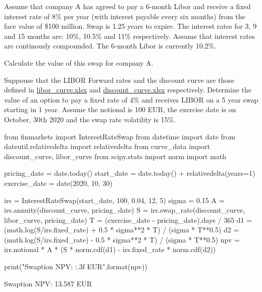 \begin{question}
Assume that company A has agreed to pay a 6-month Libor and receive a fixed interest rate of 8\% per year (with interest payable every six months) from the face value of \$100 million. Swap is 1.25 years to expire. The interest rates for 3, 9 and 15 months are: 10\%, 10.5\% and 11\% respectively. Assume that interest rates are continously compounded. The 6-month Libor is currently 10.2\%. 

Calculate the value of this swap for company A.
\end{question}

\cprotEnv\begin{solution}
\begin{ipython}

\end{ipython}
\begin{ioutput}

\end{ioutput}
\end{solution}

\begin{question}
Suppouse that the LIBOR Forward rates and the discount curve are those defined in
\href{https://github.com/matteosan1/finance_course/raw/develop/libro/input_files/libor_curve.xlsx}{libor\_curve.xlsx} and \href{https://github.com/matteosan1/finance_course/raw/develop/libro/input_files/discount_curve.xlsx}{discount\_curve.xlsx} respectively.
Determine the value of an option to pay a fixed rate of 4\% and receives LIBOR on a 5 year swap starting in 1 year. Assume the notional is 100 EUR, the exercise date is on October, 30th 2020 and the swap rate volatility is 15\%.
\end{question}

\cprotEnv\begin{solution}
\begin{ipython}
from finmarkets import InterestRateSwap
from datetime import date
from dateutil.relativedelta import relativedelta
from curve_data import discount_curve, libor_curve
from scipy.stats import norm
import math

pricing_date = date.today()
start_date = date.today() + relativedelta(years=1)
exercise_date = date(2020, 10, 30)

irs = InterestRateSwap(start_date, 100, 0.04, 12, 5)
sigma = 0.15
A = irs.annuity(discount_curve, pricing_date)
S = irs.swap_rate(discount_curve, libor_curve, pricing_date)
T = (exercise_date - pricing_date).days / 365
d1 = (math.log(S/irs.fixed_rate) + 0.5 * sigma**2 * T) / (sigma * T**0.5)
d2 = (math.log(S/irs.fixed_rate) - 0.5 * sigma**2 * T) / (sigma * T**0.5)
npv = irs.notional * A * (S * norm.cdf(d1) - irs.fixed_rate * norm.cdf(d2))

print("Swaption NPV: {:.3f} EUR".format(npv))
\end{ipython}
\begin{ioutput}
Swaption NPV: 13.587 EUR
\end{ioutput}
\end{solution}

